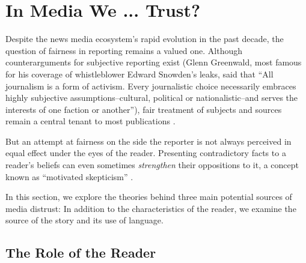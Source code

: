 \chapter{In Media We ... Trust?}

Despite the news media ecosystem's rapid evolution in the past decade, the question of fairness in reporting remains a valued one. Although counterarguments for subjective reporting exist (Glenn Greenwald, most famous for his coverage of whistleblower Edward Snowden's leaks, said that ``All journalism is a form of activism. Every journalistic choice necessarily embraces highly subjective assumptions--cultural, political or nationalistic--and serves the interests of one faction or another''), fair treatment of subjects and sources remain a central tenant to most publications \cite{Greenwald}. 
  
But an attempt at fairness on the side the reporter is not always perceived in equal effect under the eyes of the reader. Presenting contradictory facts to a reader's beliefs can even sometimes \emph{strengthen} their oppositions to it, a concept known as ``motivated skepticism'' \cite{taber2006motivated}.

In this section, we explore the theories behind three main potential sources of media distrust: In addition to the characteristics of the reader, we examine the source of the story and its use of language.



 
 


 

\section{The Role of the Reader}


